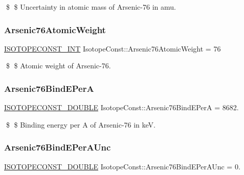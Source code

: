 \$ \$ Uncertainty in atomic mass of Arsenic-\/76 in amu. \mbox{\label{group___isotope_const-_arsenic-_as76_gae7e99f34ab9c9d0787f0f5392396ca35}} 
\subsubsection{\texorpdfstring{Arsenic76\+Atomic\+Weight}{Arsenic76AtomicWeight}}
{\footnotesize\ttfamily \mbox{\hyperlink{group___isotope_const-_macros_ga5f18360b3e99483a35c32d789e62621c}{I\+S\+O\+T\+O\+P\+E\+C\+O\+N\+S\+T\+\_\+\+I\+NT}} Isotope\+Const\+::\+Arsenic76\+Atomic\+Weight = 76}

\$ \$ Atomic weight of Arsenic-\/76. \mbox{\label{group___isotope_const-_arsenic-_as76_gab1493a51d6514b32274baad005e3aa95}} 
\subsubsection{\texorpdfstring{Arsenic76\+Bind\+E\+PerA}{Arsenic76BindEPerA}}
{\footnotesize\ttfamily \mbox{\hyperlink{group___isotope_const-_macros_ga8f45a7272ce02c0b4c65c44636ed719a}{I\+S\+O\+T\+O\+P\+E\+C\+O\+N\+S\+T\+\_\+\+D\+O\+U\+B\+LE}} Isotope\+Const\+::\+Arsenic76\+Bind\+E\+PerA = 8682.}

\$ \$ Binding energy per A of Arsenic-\/76 in keV. \mbox{\label{group___isotope_const-_arsenic-_as76_ga494539ce77fe2104173ad7738cae9b13}} 
\subsubsection{\texorpdfstring{Arsenic76\+Bind\+E\+Per\+A\+Unc}{Arsenic76BindEPerAUnc}}
{\footnotesize\ttfamily \mbox{\hyperlink{group___isotope_const-_macros_ga8f45a7272ce02c0b4c65c44636ed719a}{I\+S\+O\+T\+O\+P\+E\+C\+O\+N\+S\+T\+\_\+\+D\+O\+U\+B\+LE}} Isotope\+Const\+::\+Arsenic76\+Bind\+E\+Per\+A\+Unc = 0.}

